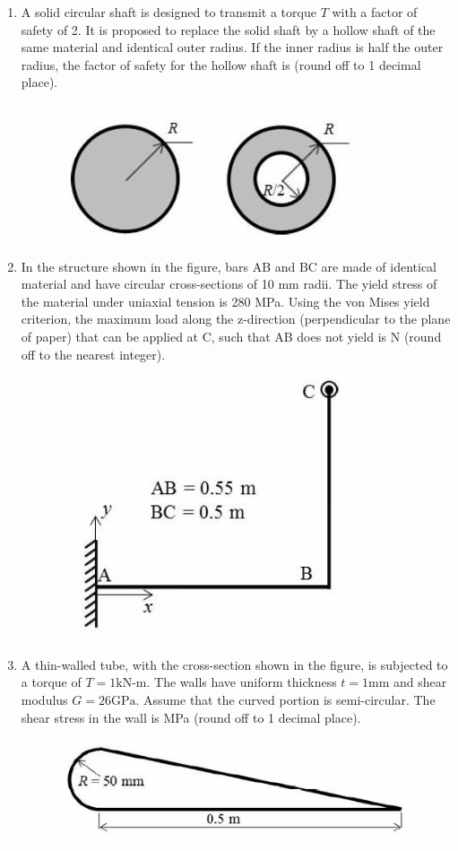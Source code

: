 \documentclass{article}
\begin{document}
\begin{enumerate}[leftmargin=*, resume]
\item A solid circular shaft is designed to transmit a torque \( T \) with a factor of safety of 2. It is proposed to replace the solid shaft by a hollow shaft of the same material and identical outer radius. If the inner radius is half the outer radius, the factor of safety for the hollow shaft is \underline{\hspace{1.5cm}} (round off to 1 decimal place).
\begin{figure}[H]
    \centering
    \includegraphics[width=0.3\linewidth]{figs/q58.png}
    \caption{}
    \label{fig:q58}
\end{figure}

\item In the structure shown in the figure, bars AB and BC are made of identical material and have circular cross-sections of 10 mm radii. The yield stress of the material under uniaxial tension is 280 MPa. Using the von Mises yield criterion, the maximum load along the z-direction (perpendicular to the plane of paper) that can be applied at C, such that AB does not yield is \underline{\hspace{1.5cm}} N (round off to the nearest integer).
\begin{figure}[H]
    \centering
    \includegraphics[width=0.3\linewidth]{figs/q59.png}
    \caption{}
    \label{fig:q59}
\end{figure}

\item A thin-walled tube, with the cross-section shown in the figure, is subjected to a torque of \( T = 1  \text{kN-m} \). The walls have uniform thickness \( t = 1  \text{mm} \) and shear modulus \( G = 26  \text{GPa} \). Assume that the curved portion is semi-circular. The shear stress in the wall is \underline{\hspace{1.5cm}} MPa (round off to 1 decimal place).
\begin{figure}[H]
    \centering
    \includegraphics[width=0.3\linewidth]{figs/q60.png}
    \caption{}
    \label{fig:q60}
\end{figure}


\end{enumerate}
\end{document}
